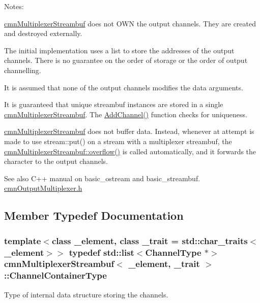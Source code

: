 Notes\+:
\begin{DoxyEnumerate}
\item \hyperlink{classcmn_multiplexer_streambuf}{cmn\+Multiplexer\+Streambuf} does not O\+W\+N the output channels. They are created and destroyed externally.
\item The initial implementation uses a list to store the addresses of the output channels. There is no guarantee on the order of storage or the order of output channelling.
\item It is assumed that none of the output channels modifies the data arguments.
\item It is guaranteed that unique streambuf instances are stored in a single \hyperlink{classcmn_multiplexer_streambuf}{cmn\+Multiplexer\+Streambuf}. The \hyperlink{classcmn_multiplexer_streambuf_a1e33a4858eb94ed085987ddbcc01a1d0}{Add\+Channel()} function checks for uniqueness.
\item \hyperlink{classcmn_multiplexer_streambuf}{cmn\+Multiplexer\+Streambuf} does not buffer data. Instead, whenever at attempt is made to use stream\+::put() on a stream with a multiplexer streambuf, the \hyperlink{classcmn_multiplexer_streambuf_a90999d31356176b52174452e2a43c1ae}{cmn\+Multiplexer\+Streambuf\+::overflow()} is called automatically, and it forwards the character to the output channels.

\begin{DoxySeeAlso}{See also}
C++ manual on basic\+\_\+ostream and basic\+\_\+streambuf. \hyperlink{cmn_output_multiplexer_8h}{cmn\+Output\+Multiplexer.\+h} 
\end{DoxySeeAlso}

\end{DoxyEnumerate}

\subsection{Member Typedef Documentation}
\hypertarget{classcmn_multiplexer_streambuf_a3b414c7f89b55584aef7c8b655bc03ea}{}
\subsubsection[{Channel\+Container\+Type}]{\setlength{\rightskip}{0pt plus 5cm}template$<$class \+\_\+element, class \+\_\+trait = std\+::char\+\_\+traits$<$\+\_\+element$>$$>$ typedef std\+::list$<${\bf Channel\+Type} $\ast$$>$ {\bf cmn\+Multiplexer\+Streambuf}$<$ \+\_\+element, \+\_\+trait $>$\+::{\bf Channel\+Container\+Type}}\label{classcmn_multiplexer_streambuf_a3b414c7f89b55584aef7c8b655bc03ea}
Type of internal data structure storing the channels. \hypertarget{classcmn_multiplexer_streambuf_a7eb353f0b5fed1a2c8707712aac82095}{}

